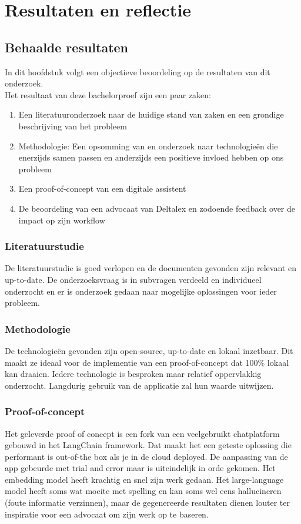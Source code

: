 \chapter{Resultaten en reflectie}
\label{ch:results_reflection}
\section{Behaalde resultaten}
In dit hoofdstuk volgt een objectieve beoordeling op de resultaten van dit onderzoek. \\ 

Het resultaat van deze bachelorproef zijn een paar zaken:

\begin{enumerate}
	\item Een literatuuronderzoek naar de huidige stand van zaken en een grondige beschrijving van het probleem 
	\item Methodologie: Een opsomming van en onderzoek naar technologieën die enerzijds samen passen en anderzijds een positieve invloed hebben op ons probleem
	\item Een proof-of-concept van een digitale assistent
	\item De beoordeling van een advocaat van Deltalex en zodoende feedback over de impact op zijn workflow
\end{enumerate}

\subsection{Literatuurstudie}
De literatuurstudie is goed verlopen en de documenten gevonden zijn relevant en up-to-date. 
De onderzoeksvraag is in subvragen verdeeld en individueel onderzocht en er is onderzoek gedaan naar mogelijke oplossingen voor ieder probleem. 

\subsection{Methodologie}
De technologieën gevonden zijn open-source, up-to-date en lokaal inzetbaar. 
Dit maakt ze ideaal voor de implementie van een proof-of-concept dat 100\% lokaal kan draaien. 
Iedere technologie is besproken maar relatief oppervlakkig onderzocht. 
Langdurig gebruik van de applicatie zal hun waarde uitwijzen. 

\subsection{Proof-of-concept}
Het geleverde proof of concept is een fork van een veelgebruikt chatplatform gebouwd in het LangChain framework. 
Dat maakt het een geteste oplossing die performant is out-of-the box als je in de cloud deployed. 
De aanpassing van de app gebeurde met trial and error maar is uiteindelijk in orde gekomen. 
Het embedding model heeft krachtig en snel zijn werk gedaan. 
Het large-language model heeft soms wat moeite met spelling en kan soms wel eens hallucineren (foute informatie verzinnen),
maar de gegenereerde resultaten dienen louter ter inspiratie voor een advocaat om zijn werk op te baseren. 

